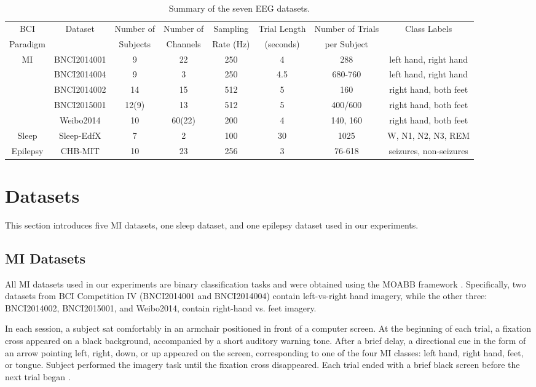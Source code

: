 \documentclass[journal,twocolumn]{IEEEtran}
\begin{document}
\begin{table}[htpb] \centering
  \caption{Summary of the seven EEG datasets.}
  \label{tab:datasets}
  \begin{tabular}{c|c|c|c|c|c|c|c}
  \toprule
  BCI&\multirow{2}{*}{Dataset} & Number of & Number of & Sampling & Trial Length & Number of Trials  & \multirow{2}{*}{Class Labels} \\
  Paradigm& & Subjects & Channels & Rate (Hz) & (seconds) & per Subject &  \\
  \midrule
  \multirow{4}{*}{MI}&BNCI2014001 & 9 & 22 & 250 & 4  & 288 &  left hand, right hand \\
  &BNCI2014004 & 9 & 3 & 250 & 4.5 & 680-760 &  left hand, right hand \\
  &BNCI2014002 & 14 & 15 & 512 & 5 & 160 &  right hand, both feet \\
  &BNCI2015001 & 12(9) & 13 & 512 & 5 & 400/600 &  right hand, both feet \\
  &Weibo2014 & 10 & 60(22) & 200 & 4 & 140, 160 &  right hand, both feet \\
  \midrule
  Sleep&Sleep-EdfX& 7 & 2 & 100 & 30 & 1025 &  W, N1, N2, N3, REM \\
  \midrule
  Epilepsy&CHB-MIT&10&23&256&3&76-618&seizures, non-seizures \\
  \bottomrule
  \end{tabular}
\end{table}

  
\section{Datasets} \label{sec:datasets}

This section introduces five MI datasets, one sleep dataset, and one epilepsy dataset used in our experiments.

\subsection{MI Datasets}
All MI datasets used in our experiments are binary classification tasks and were obtained using the MOABB framework \cite{jayaram2018moabb}. Specifically, two datasets from BCI Competition IV (BNCI2014001 and BNCI2014004) \cite{tangermann2012review} contain left-vs-right hand imagery, while the other three: BNCI2014002, BNCI2015001, and Weibo2014, contain right-hand vs. feet imagery. 

In each session, a subject sat comfortably in an armchair positioned in front of a computer screen. At the beginning of each trial, a fixation cross appeared on a black background, accompanied by a short auditory warning tone. After a brief delay, a directional cue in the form of an arrow pointing left, right, down, or up appeared on the screen, corresponding to one of the four MI classes: left hand, right hand, feet, or tongue. Subject performed the imagery task until the fixation cross disappeared. Each trial ended with a brief black screen before the next trial began \cite{tangermann2012review}.
\end{document}
